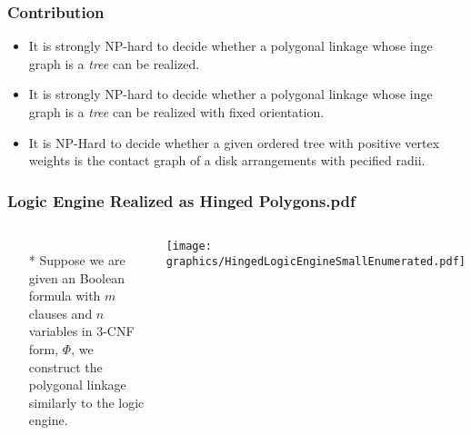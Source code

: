 \documentclass{beamer}
\begin{document}
\begin{frame}\frametitle{Contribution}
     \begin{itemize}
    \item It is strongly NP-hard to decide whether a polygonal linkage whose inge graph is a \textit{tree} can be realized.
    \item It is strongly NP-hard to decide whether a polygonal linkage whose inge graph is a \textit{tree} can be realized with fixed orientation.
    \item It is NP-Hard to decide whether a given ordered tree with positive vertex weights is the contact graph of a disk arrangements with pecified radii.
    \end{itemize}
\end{frame}
\begin{frame} \frametitle{Logic Engine Realized as Hinged Polygons.pdf}
    \begin{columns}[c]
        \begin{itemize}
            \item[*] Suppose we are given an Boolean formula with $m$ clauses and $n$ variables in 3-CNF form, $\Phi$, we construct the polygonal linkage similarly to the logic engine.
        \end{itemize}
        \begin{minipage}{\linewidth}
            \begin{center}
            \texttt{[image: graphics/HingedLogicEngineSmallEnumerated.pdf]}
            \label{gfx:HingedLogicEngineSmallEnumerated.pdf}
            \end{center}
        \end{minipage}
    \end{columns}
\end{frame}
\end{document}
